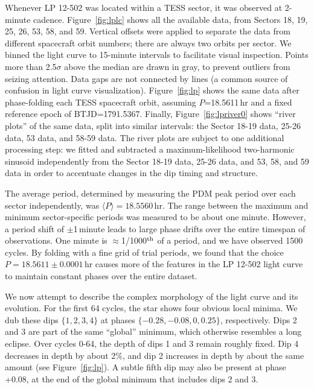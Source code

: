 \documentclass[11pt,twocolumn,tighten,linenumbers]{aastex63}
\begin{document}
Whenever LP 12-502 was located within a TESS sector, it was observed
at 2-minute cadence.  Figure~\ref{fig:lplc} shows all the available
data, from Sectors 18, 19, 25, 26, 53, 58, and 59. Vertical offsets
were applied to separate the data from different spacecraft orbit
numbers; there are always two orbits per sector.  We binned the light
curve to 15-minute intervals to facilitate visual inspection.  Points
more than 2.5$\sigma$ above the median are drawn in gray, to prevent
outliers from seizing attention.  Data gaps are not connected by lines
(a common source of confusion in light curve visualization).
Figure~\ref{fig:lp} shows the same data after phase-folding each TESS
spacecraft orbit, assuming $P$=18.5611\,hr and a fixed reference epoch
of BTJD=1791.5367.  Finally, Figure~\ref{fig:lpriver0} shows ``river
plots'' of the same data, split into similar intervals: the Sector
18-19 data, 25-26 data, 53 data, and 58-59 data.  The river plots are
subject to one additional processing step: we fitted and subtracted a
maximum-likelihood two-harmonic sinusoid independently from the Sector
18-19 data, 25-26 data, and 53, 58, and 59 data in order to accentuate
changes in the dip timing and structure.

The average period, determined by measuring the PDM peak period over
each sector independently, was $\langle P \rangle = 18.5560$\,hr.  The
range between the maximum and minimum sector-specific periods was
measured to be about one minute.   However, a period shift of
$\pm$1\,minute leads to large phase drifts over the entire timespan of
observations.  One minute is $\approx$1/1000$^{\rm th}$ of a period,
and we have observed 1500 cycles.  By folding with a fine grid of
trial periods, we found that the choice $P=18.5611 \pm 0.0001$\,hr causes
more of the features in the LP 12-502 light curve to maintain constant
phases over the entire dataset.

We now attempt to describe the complex morphology of the light curve
and its evolution.  For the first 64 cycles, the star shows four
obvious local minima.  We dub these dips $\{ 1, 2, 3, 4 \}$ at phases
$\{ -0.28, -0.08, 0, 0.25 \}$, respectively.  Dips 2 and 3 are part of
the same ``global'' minimum, which otherwise resembles a long eclipse.
Over cycles 0-64, the depth of dips 1 and 3 remain roughly fixed.  Dip
4 decreases in depth by about 2\%, and dip 2 increases in depth by
about the same amount (see Figure~\ref{fig:lp}).  A subtle fifth dip
may also be present at phase +0.08, at the end of the global minimum
that includes dips 2 and 3.
\end{document}
